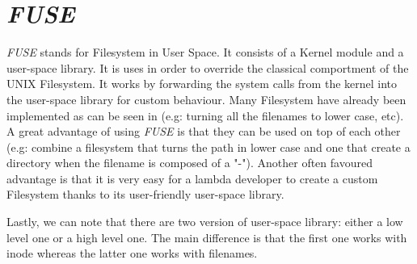 \documentclass[../main.tex]{subfiles}
\begin{document}
\section{\textit{FUSE}}
\label{section:theoric:fuse}

\par \textit{FUSE} stands for Filesystem in User Space. It consists of a Kernel module and a user-space library. It is uses in order to override the classical comportment of the UNIX Filesystem. It works by forwarding the system calls from the kernel into the user-space library for custom behaviour. Many Filesystem have already been implemented as can be seen in \cite{fuseExamples} (e.g: turning all the filenames to lower case, etc). A great advantage of using \textit{FUSE} is that they can be used on top of each other (e.g: combine a filesystem that turns the path in lower case and one that create a directory when the filename is composed of a "-"). Another often favoured advantage is that it is very easy for a lambda developer to create a custom Filesystem thanks to its user-friendly user-space library.
\par Lastly, we can note that there are two version of user-space library: either a low level one or a high level one. The main difference is that the first one works with inode whereas the latter one works with filenames.
\end{document}
